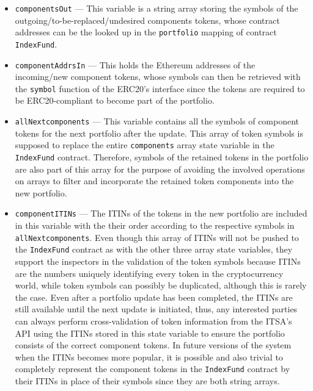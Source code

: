 \begin{itemize}
    \item \texttt{componentsOut} --- This variable is a string array storing the symbols of the outgoing/to-be-replaced/undesired components tokens, whose contract addresses can be the looked up in the \texttt{portfolio} mapping of contract \texttt{IndexFund}.
    
    \item \texttt{componentAddrsIn} --- This holds the Ethereum addresses of the incoming/new component tokens, whose symbols can then be retrieved with the \texttt{symbol} function of the ERC20's interface since the tokens are required to be ERC20-compliant to become part of the portfolio.
    
    \item \texttt{allNextcomponents} --- This variable contains all the symbols of component tokens for the next portfolio after the update. This array of token symbols is supposed to replace the entire \texttt{components} array state variable in the \texttt{IndexFund} contract. Therefore, symbols of the retained tokens in the portfolio are also part of this array for the purpose of avoiding the involved operations on arrays to filter and incorporate the retained token components into the new portfolio.
    
    \item \texttt{componentITINs} --- The ITINs of the tokens in the new portfolio are included in this variable with the their order according to the respective symbols in \texttt{allNextcomponents}. Even though this array of ITINs will not be pushed to the \texttt{IndexFund} contract as with the other three array state variables, they support the inspectors in the validation of the token symbols because ITINs are the numbers uniquely identifying every token in the cryptocurrency world, while token symbols can possibly be duplicated, although this is rarely the case. Even after a portfolio update has been completed, the ITINs are still available until the next update is initiated, thus, any interested parties can always perform cross-validation of token information from the ITSA's API using the ITINs stored in this state variable to ensure the portfolio consists of the correct component tokens. In future versions of the system when the ITINs becomes more popular, it is possible and also trivial to completely represent the component tokens in the \texttt{IndexFund} contract by their ITINs in place of their symbols since they are both string arrays.
    
\end{itemize}

